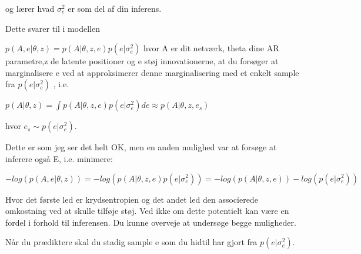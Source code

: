 og lærer hvad $\sigma^2_e$ er som del af din inferens.


Dette svarer til i modellen

$p(A,e|\theta,z)= p(A|\theta,z,e)p(e|\sigma^2_e) $
hvor A er dit netværk, theta dine AR parametre,z de latente positioner og e støj innovationerne, at du forsøger at marginalisere e ved at approksimerer denne marginalisering med et enkelt sample fra $p(e|\sigma^2_e)$ , i.e.


$p(A|\theta,z)=\int p(A|\theta,z,e)p(e|\sigma^2_e)  de \approx p(A|\theta,z,e_s)$

hvor $e_s\sim p(e|\sigma^2_e)$. 



Dette er som jeg ser det helt OK, men en anden mulighed var at forsøge at inferere også E, i.e. minimere:

$-log(p(A,e|\theta,z))=-log( p(A|\theta,z,e)p(e|\sigma^2_e) )=-log( p(A|\theta,z,e))-log(p(e|\sigma^2_e) )$

Hvor det første led er krydsentropien og det andet led den associerede omkostning ved at skulle tilføje støj. Ved ikke om dette potentielt kan være en fordel i forhold til inferensen. Du kunne overveje at undersøge begge muligheder.



Når du prædiktere skal du stadig sample e som du hidtil har gjort fra $p(e|\sigma^2_e)$.